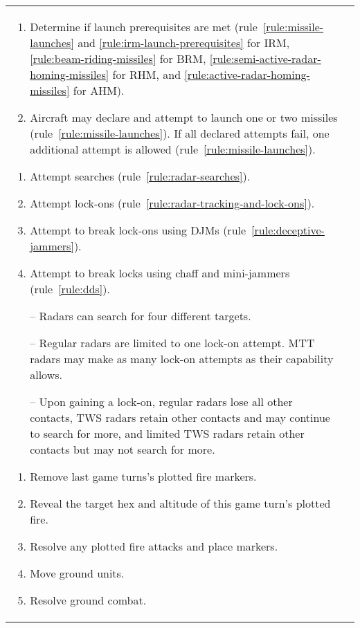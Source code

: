 \begin{twocolumntable}
\begin{tabularx}{1.0\linewidth}{L@{\hspace{\columnsep}}L}
{\begin{enumerate}[start=7]
\begin{enumerate}[nosep]
    \item Determine if launch prerequisites are met (rule~\ref{rule:missile-launches} and \ref{rule:irm-launch-prerequisites} for IRM, \ref{rule:beam-riding-missiles} for BRM, \ref{rule:semi-active-radar-homing-missiles} for RHM, and \ref{rule:active-radar-homing-missiles} for AHM).
    \item Aircraft may declare and attempt to launch one or two missiles (rule~\ref{rule:missile-launches}). If all declared attempts fail, one additional attempt is allowed (rule~\ref{rule:missile-launches}).
\end{enumerate}


\begin{enumerate}[nosep]
    \item Attempt searches (rule~\ref{rule:radar-searches}).
    \item Attempt lock-ons (rule~\ref{rule:radar-tracking-and-lock-ons}).
    \item Attempt to break lock-ons using DJMs (rule~\ref{rule:deceptive-jammers}).
    \item Attempt to break locks using chaff and mini-jammers (rule~\ref{rule:dds}).
    \item[--] Radars can search for four different targets.
    \item[--] Regular radars are limited to one lock-on attempt. MTT radars may make as many lock-on attempts as their capability allows.
    \item[--] Upon gaining a lock-on, regular radars lose all other contacts, TWS radars retain other contacts and may continue to search for more, and limited TWS radars retain other contacts but may not search for more.    
\end{enumerate}


\begin{enumerate}[nosep]
    \item Remove last game turns's plotted fire markers.
    \item Reveal the target hex and altitude of this game turn's plotted fire.
    \item Resolve any plotted fire attacks and place markers.
    \item Move ground units.
    \item Resolve ground combat.
\end{enumerate}


\end{enumerate}}
\end{tabularx}
\end{twocolumntable}
